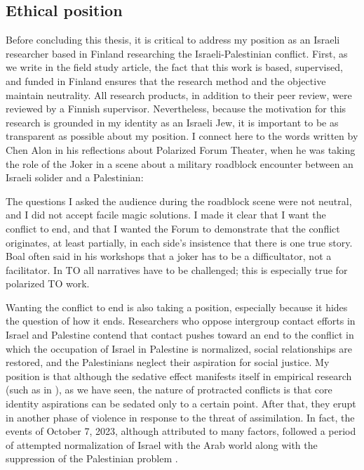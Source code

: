 \documentclass[dissertation,math,vertlayout,pdfa,colorlinks,nologo]{aaltoseries}
\begin{document}
\subsection{Ethical position}
Before concluding this thesis, it is critical to address my position as an Israeli researcher based in Finland researching the Israeli-Palestinian conflict. First, as we write in the field study article, the fact that this work is based, supervised, and funded in Finland ensures that the research method and the objective maintain neutrality. All research products, in addition to their peer review, were reviewed by a Finnish supervisor. Nevertheless, because the motivation for this research is grounded in my identity as an Israeli Jew, it is important to be as transparent as possible about my position. I connect here to the words written by Chen Alon in his reflections about Polarized Forum Theater, when he was taking the role of the Joker in a scene about a military roadblock encounter between an Israeli solider and a Palestinian:
\begin{displayquote}
The questions I asked the audience during the roadblock scene were not neutral, and I did not accept facile magic solutions. I made it clear that I want the conflict to end, and that I wanted the Forum to demonstrate that the conflict originates, at least partially, in each side's insistence that there is one true story. Boal often said in his workshops that a joker has to be a difficultator, not a facilitator. In TO all narratives have to be challenged; this is especially true for polarized TO work.
\end{displayquote}
Wanting the conflict to end is also taking a position, especially because it hides the question of how it ends. Researchers who oppose intergroup contact efforts in Israel and Palestine contend that contact pushes toward an end to the conflict in which the occupation of Israel in Palestine is normalized, social relationships are restored, and the Palestinians neglect their aspiration for social justice. My position is that although the sedative effect manifests itself in empirical research (such as in \cite{albzourTalkingSegregationWall2022}), as we have seen, the nature of protracted conflicts is that core identity aspirations can be sedated only to a certain point. After that, they erupt in another phase of violence in response to the threat of assimilation. In fact, the events of October 7, 2023, although attributed to many factors, followed a period of attempted normalization of Israel with the Arab world along with the suppression of the Palestinian problem \cite{fraihatUnderstandingOctober7th2024}. 
\end{document}
